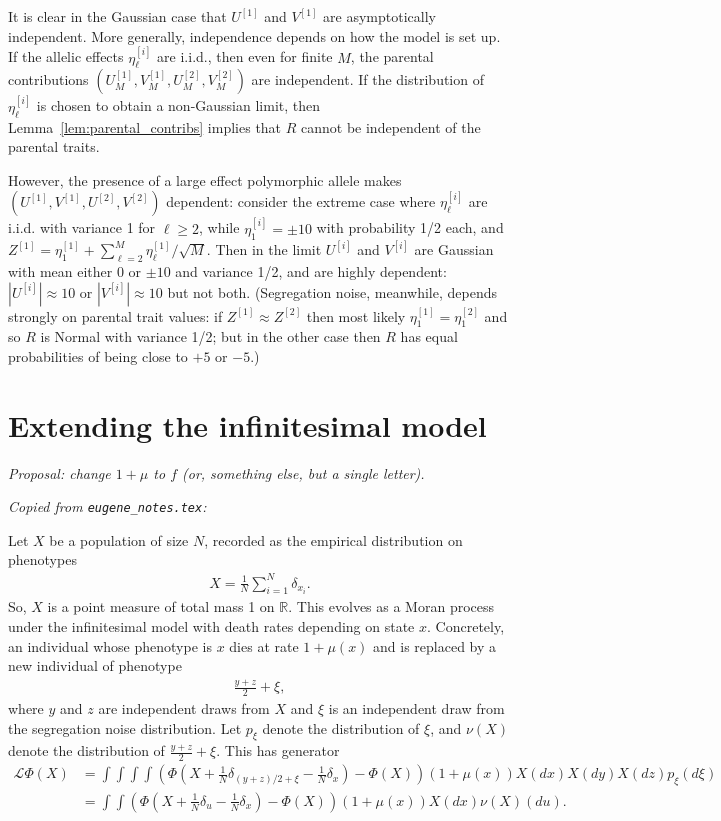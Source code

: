 \documentclass{article}
\newcommand{\R}{\mathbb{R}}
\newcommand{\mL}{\mathcal{L}}
\newcommand{\comment}[1]{{\color{blue} \it #1}}
\theoremstyle{remark}
\theoremstyle{definition}
\begin{document}
It is clear in the Gaussian case
that $U^{[1]}$ and $V^{[1]}$ are asymptotically independent.
More generally, independence depends on how the model is set up.
If the allelic effects $\eta_\ell^{[i]}$ are i.i.d.,
then even for finite $M$, the parental contributions
$(U_M^{[1]}, V_M^{[1]}, U_M^{[2]}, V_M^{[2]})$ are independent.
If the distribution of $\eta_\ell^{[i]}$ is chosen to obtain a non-Gaussian limit,
then Lemma~\ref{lem:parental_contribs} implies that $R$ cannot be independent of the parental traits.

However, the presence of a large effect polymorphic allele
makes $(U^{[1]}, V^{[1]}, U^{[2]}, V^{[2]})$ dependent:
consider the extreme case where $\eta^{[i]}_\ell$ are i.i.d.{} with variance 1 for $\ell \ge 2$,
while $\eta^{[i]}_1 = \pm 10$ with probability 1/2 each,
and $Z^{[1]} = \eta_1^{[1]} + \sum_{\ell=2}^M \eta_\ell^{[1]} / \sqrt{M}$.
Then in the limit $U^{[i]}$ and $V^{[i]}$ are Gaussian with mean either 0 or $\pm 10$ and variance 1/2,
and are highly dependent: $|U^{[i]}| \approx 10$ or $|V^{[i]}| \approx 10$ but not both.
(Segregation noise, meanwhile, depends strongly on parental trait values:
if $Z^{[1]} \approx Z^{[2]}$ then most likely
$\eta_1^{[1]} = \eta_1^{[2]}$ and so $R$ is Normal with variance 1/2;
but in the other case then $R$ has equal probabilities of being close to $+5$ or $-5$.)


\section{Extending the infinitesimal model}  %

\comment{Proposal: change $1 + \mu$ to $f$ (or, something else, but a single letter).}

\comment{Copied from \texttt{eugene\_notes.tex}:}

Let $X$ be a population of size $N$, recorded as the empirical distribution on phenotypes
\begin{align*}
    X = \frac{1}{N} \sum_{i=1}^N \delta_{x_i} .
\end{align*}
So, $X$ is a point measure of total mass 1 on $\R$.
This evolves as a Moran process under the infinitesimal model
with death rates depending on state $x$.
Concretely, an individual whose phenotype is $x$
dies at rate $1 + \mu(x)$
and is replaced by a new individual of phenotype
\begin{align*}
  \frac{y + z}{2} + \xi ,
\end{align*}
where $y$ and $z$ are independent draws from $X$
and $\xi$ is an independent draw from the segregation noise distribution.
Let $p_\xi$ denote the distribution of $\xi$,
and $\nu(X)$ denote the distribution of $\frac{y + z}{2} + \xi$.
This has generator
\begin{align*}
    \mL \Phi(X)
    &=
    \int \int \int \int
    \left( \Phi\left( X + \frac{1}{N} \delta_{(y+z)/2 + \xi} - \frac{1}{N} \delta_x \right) - \Phi(X) \right)
    (1 + \mu(x)) X(dx) X(dy) X(dz) p_\xi(d\xi) \\
    &=
    \int \int
    \left( \Phi\left(X + \frac{1}{N} \delta_u - \frac{1}{N} \delta_x\right) - \Phi(X) \right)
    (1 + \mu(x)) X(dx) \nu(X)(du) .
\end{align*}
\end{document}

